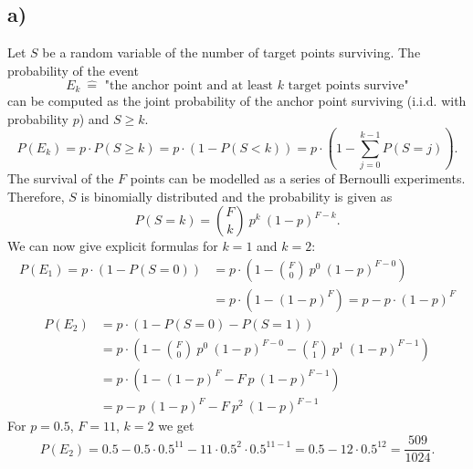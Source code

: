 \documentclass[12pt]{article}
\begin{document}
\subsection*{a)}
Let $S$ be a random variable of the number of target points surviving. The probability of the event
\[E_k\: \hat{=} \text{ "the anchor point and at least }k\text{ target points survive"}\]
can be computed as the joint probability of the anchor point surviving (i.i.d. with probability $p$) and $S\geq k$.
\[ P(E_k) = p \cdot P(S\geq k) = p\cdot (1-P(S < k)) = p \cdot \left(1-\sum_{j=0}^{k-1}P(S=j)\right). \]
The survival of the $F$ points can be modelled as a series of Bernoulli experiments. Therefore, $S$ is binomially distributed and the probability is given as
\[ P(S=k) = {F\choose k}\: p^k\:(1-p)^{F-k}. \]
We can now give explicit formulas for $k=1$ and $k=2$:
\begin{align*}
    P(E_1) = p\cdot (1-P(S=0)) &= p \cdot \left(1-{F\choose 0}\: p^0\:(1-p)^{F-0}\right) \\
    &= p \cdot \left(1-(1-p)^F\right) = p - p\cdot (1-p)^F
\end{align*}
\begin{align*}
    P(E_2) &= p\cdot (1-P(S=0)-P(S=1)) \\
    &= p \cdot \left(1-{F\choose 0}\: p^0\:(1-p)^{F-0} - {F\choose 1}\: p^1\:(1-p)^{F-1}\right) \\
    &= p \cdot \left(1-(1-p)^F - F\: p\: (1-p)^{F-1}\right) \\
    &= p - p\:(1-p)^F - F\: p^2\: (1-p)^{F-1}
\end{align*}
For $p=0.5$, $F=11$, $k=2$ we get
\[ P(E_2) = 0.5 - 0.5\cdot 0.5^{11} - 11 \cdot 0.5^2 \cdot 0.5^{11-1} = 0.5 - 12\cdot 0.5^{12} = \frac{509}{1024}. \]
\end{document}
